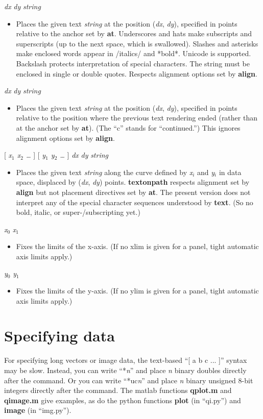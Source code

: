 \documentclass[11pt]{article}
\def\cmd#1#2{\noindent {\bf #1} #2\par}
\def\expl#1{\kern-8pt\begin{itemize}\item[]#1\end{itemize}}
\def\cref#1{{\bf #1}}
\begin{document}
\cmd{text}{\emph{dx} \emph{dy} \emph{string}}
\expl{Places the given text \emph{string} at the position (\emph{dx},
  \emph{dy}), specified in points relative to the anchor set by
  \cref{at}. Underscores and hats make subscripts and superscripts
  (up to the next space, which is swallowed).
  Slashes and asterisks make enclosed words
  appear in /italics/ and *bold*. Unicode is supported. Backslash
  protects interpretation of special characters. The string
  must be enclosed in single or double quotes. Respects alignment
  options set by \cref{align}.}

\cmd{ctext}{\emph{dx} \emph{dy} \emph{string}}
\expl{Places the given text \emph{string} at the position (\emph{dx},
  \emph{dy}), specified in points relative to the position where the
  previous text rendering ended (rather than at the anchor set by
  \cref{at}). (The ``c'' stands for ``continued.'')
  This ignores alignment options set by \cref{align}.}

\cmd{textonpath}{[ \emph{x$_1$ x$_2$ \ldots} ] [ \emph{y$_1$ y$_2$
      \ldots} ] \emph{dx} \emph{dy}
  \emph{string}}
\expl{Places the given text \emph{string} along the
  curve defined by \emph{x$_i$} and \emph{y$_i$} in data space, displaced by
  (\emph{dx}, \emph{dy}) points. \cref{textonpath} respects alignment
  set by \cref{align} but not placement directives set by \cref{at}. The
  present version does not interpret any of the special character
  sequences understood by \cref{text}. (So no bold, italic, or
  super-/subscripting yet.)}

\cmd{xlim}{\emph{x$_0$} \emph{x$_1$}}
\expl{Fixes the limits of the x-axis. (If no xlim is given for a panel, tight
  automatic axis limits apply.)}

\cmd{ylim}{\emph{y$_0$} \emph{y$_1$}}
\expl{Fixes the limits of the y-axis. (If no ylim is given for a panel, tight
  automatic axis limits apply.)}

\section{Specifying data}

For specifying long vectors or image data, the text-based ``[ a b
  c ... ]'' syntax may be slow. Instead, you can write
``*\emph{n}'' and place \emph{n} binary doubles directly after the
command. Or you can write ``*uc\emph{n}'' and place \emph{n} binary
unsigned 8-bit integers directly after the command. The matlab
functions \cref{qplot.m} and \cref{qimage.m} give examples, as do the
python functions \cref{plot} (in ``qi.py'') and \cref{image} (in ``img.py'').
\end{document}
